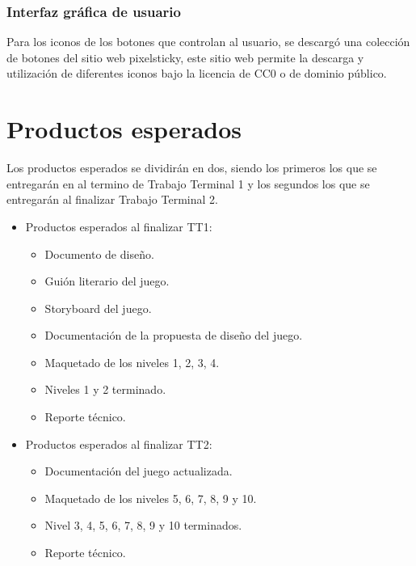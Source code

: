 	\subsubsection{Interfaz gráfica de usuario}
Para los iconos de los botones que controlan al usuario, se descargó una colección de botones del sitio web pixelsticky, este sitio web permite la descarga y utilización de diferentes iconos bajo la licencia de CC0 o de dominio público.

\section{Productos esperados}\label{Sec_Producto}
Los productos esperados se dividirán en dos, siendo los primeros los que se entregarán en al termino de Trabajo Terminal 1 y los segundos los que se entregarán al finalizar Trabajo Terminal 2.

\begin{itemize}
	\item Productos esperados al finalizar TT1:
		\begin{itemize}
			\item Documento de diseño.
			\item Guión literario del juego.
			\item Storyboard del juego.
			\item Documentación de la propuesta de diseño del juego.
			\item Maquetado de los niveles 1, 2, 3, 4.
			\item Niveles 1 y 2 terminado.
			\item Reporte técnico.
		\end{itemize}
	\item Productos esperados al finalizar TT2:
		\begin{itemize}
			\item Documentación del juego actualizada.
			\item Maquetado de los niveles 5, 6, 7, 8, 9 y 10.
			\item Nivel 3, 4, 5, 6, 7, 8, 9 y 10 terminados.
			\item Reporte técnico.
		\end{itemize}
\end{itemize}